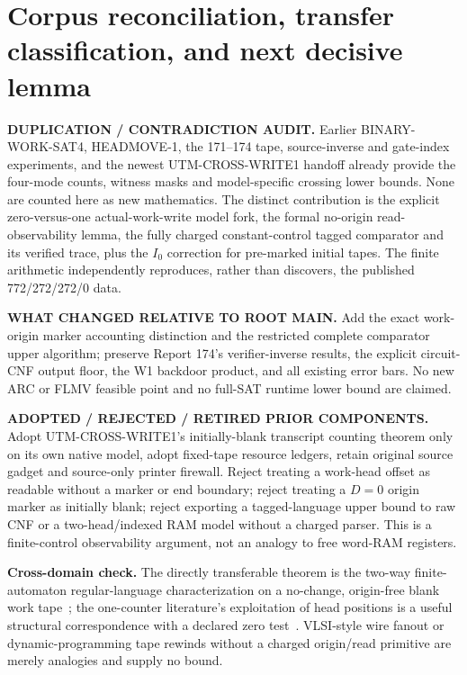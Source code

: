 \documentclass[11pt]{article}
\begin{document}
\section{Corpus reconciliation, transfer classification, and next decisive lemma}
\textbf{DUPLICATION / CONTRADICTION AUDIT.} Earlier BINARY-WORK-SAT4, HEADMOVE-1, the 171--174 tape, source-inverse and gate-index experiments, and the newest UTM-CROSS-WRITE1 handoff already provide the four-mode counts, witness masks and model-specific crossing lower bounds. None are counted here as new mathematics. The distinct contribution is the explicit zero-versus-one actual-work-write model fork, the formal no-origin read-observability lemma, the fully charged constant-control tagged comparator and its verified trace, plus the $I_0$ correction for pre-marked initial tapes. The finite arithmetic independently reproduces, rather than discovers, the published 772/272/272/0 data.

\textbf{WHAT CHANGED RELATIVE TO ROOT MAIN.} Add the exact work-origin marker accounting distinction and the restricted complete comparator upper algorithm; preserve Report 174's verifier-inverse results, the explicit circuit-CNF output floor, the W1 backdoor product, and all existing error bars. No new ARC or FLMV feasible point and no full-SAT runtime lower bound are claimed.

\textbf{ADOPTED / REJECTED / RETIRED PRIOR COMPONENTS.} Adopt UTM-CROSS-WRITE1's initially-blank transcript counting theorem only on its own native model, adopt fixed-tape resource ledgers, retain original source gadget and source-only printer firewall. Reject treating a work-head offset as readable without a marker or end boundary; reject treating a $D=0$ origin marker as initially blank; reject exporting a tagged-language upper bound to raw CNF or a two-head/indexed RAM model without a charged parser. This is a finite-control observability argument, not an analogy to free word-RAM registers.

\textbf{Cross-domain check.} The directly transferable theorem is the two-way finite-automaton regular-language characterization on a no-change, origin-free blank work tape~\cite{twofa}; the one-counter literature's exploitation of head positions is a useful structural correspondence with a declared zero test~\cite{counter}. VLSI-style wire fanout or dynamic-programming tape rewinds without a charged origin/read primitive are merely analogies and supply no bound.
\end{document}
